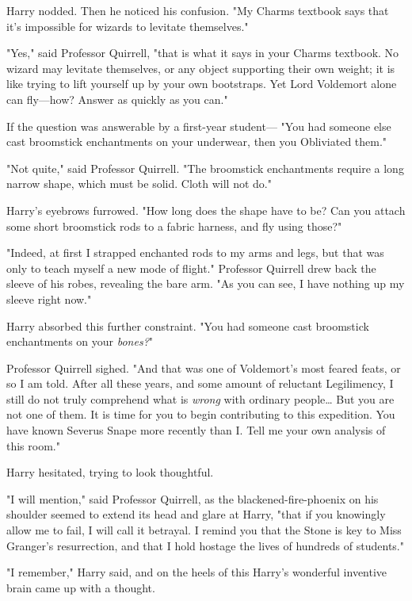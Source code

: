 Harry nodded. Then he noticed his confusion. "My Charms textbook says that it's 
impossible for wizards to levitate themselves."

"Yes," said Professor Quirrell, "that is what it says in your Charms textbook. 
No wizard may levitate themselves, or any object supporting their own weight; 
it is like trying to lift yourself up by your own bootstraps. Yet Lord 
Voldemort alone can fly---how? Answer as quickly as you can."

If the question was answerable by a first-year student--- "You had someone else 
cast broomstick enchantments on your underwear, then you Obliviated them."

"Not quite," said Professor Quirrell. "The broomstick enchantments require a 
long narrow shape, which must be solid. Cloth will not do."

Harry's eyebrows furrowed. "How long does the shape have to be? Can you attach 
some short broomstick rods to a fabric harness, and fly using those?"

"Indeed, at first I strapped enchanted rods to my arms and legs, but that was 
only to teach myself a new mode of flight." Professor Quirrell drew back the 
sleeve of his robes, revealing the bare arm. "As you can see, I have nothing up 
my sleeve right now."

Harry absorbed this further constraint. "You had someone cast broomstick 
enchantments on your \emph{bones?}"

Professor Quirrell sighed. "And that was one of Voldemort's most feared feats, 
or so I am told. After all these years, and some amount of reluctant 
Legilimency, I still do not truly comprehend what is \emph{wrong} with ordinary 
people{\ldots} But you are not one of them. It is time for you to begin 
contributing to this expedition. You have known Severus Snape more recently 
than I. Tell me your own analysis of this room."

Harry hesitated, trying to look thoughtful.

"I will mention," said Professor Quirrell, as the blackened-fire-phoenix on his 
shoulder seemed to extend its head and glare at Harry, "that if you knowingly 
allow me to fail, I will call it betrayal. I remind you that the Stone is key 
to Miss Granger's resurrection, and that I hold hostage the lives of hundreds 
of students."

"I remember," Harry said, and on the heels of this Harry's wonderful inventive 
brain came up with a thought.

